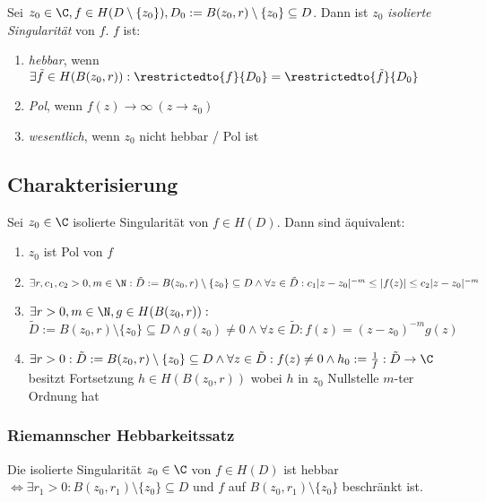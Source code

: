 Sei \(z_0 \in \C, f \in H(D \setminus \{z_0\}), D_0 := B(z_0,r) \setminus \{z_0\} \subseteq D\). Dann ist \(z_0\) \emph{isolierte Singularität} von \(f\). \(f\) ist:

\begin{enumerate}[label=(\alph*)]
	\item \emph{hebbar}, wenn \(\exists \tilde f \in H(B(z_0,r)) : \restrictedto{f}{D_0} = \restrictedto{\tilde f}{D_0}\)
	\item \emph{Pol}, wenn \(f(z) \to \infty \ (z \to z_0)\)
	\item \emph{wesentlich}, wenn \(z_0\) nicht hebbar / Pol ist
\end{enumerate}

\subsection*{Charakterisierung}

Sei \(z_0 \in \C\) isolierte Singularität von \(f \in H(D)\). Dann sind äquivalent:

\begin{enumerate}[label=(\alph*)]
	\item \(z_0\) ist Pol von \(f\)
	\item \(\exists r, c_1, c_2 > 0, m \in \N : \tilde D := B(z_0,r) \setminus \{z_0\} \subseteq D \land \forall z \in \tilde D : c_1|z-z_0|^{-m} \leq |f(z)| \leq c_2|z-z_0|^{-m}\)
	\item \(\exists r > 0, m \in \N, g \in H(B(z_0,r)) :\) \\ \(\tilde D := B(z_0,r) \setminus \{z_0\} \subseteq D \land g(z_0) \neq 0 \land \forall z \in \tilde D : f(z) = (z-z_0)^{-m}g(z)\)
	\item \(\exists r > 0 : \tilde D := B(z_0,r) \setminus \{z_0\} \subseteq D \land \forall z \in \tilde D : f(z) \neq 0 \land h_0 := \frac{1}{f} : \tilde D \to \C\) besitzt Fortsetzung \(h \in H(B(z_0,r))\) wobei \(h\) in \(z_0\) Nullstelle \(m\)-ter Ordnung hat
\end{enumerate}

\subsubsection*{Riemannscher Hebbarkeitssatz}

Die isolierte Singularität \(z_0 \in \C\) von \(f \in H(D)\) ist hebbar \(\iff \exists r_1 > 0 : B(z_0,r_1) \setminus \{z_0\} \subseteq D\) und \(f\) auf \(B(z_0,r_1) \setminus \{z_0\}\) beschränkt ist.

